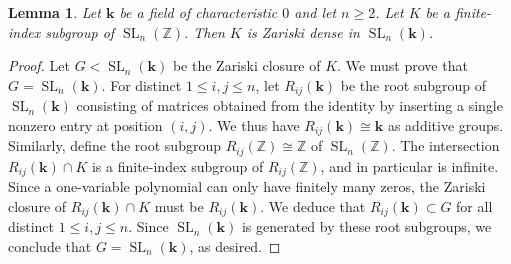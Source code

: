 \documentclass[11pt]{article}
\numberwithin{equation}{section}
\theoremstyle{plain}
\newtheorem{lemma}[theorem]{Lemma}
\theoremstyle{definition}
\theoremstyle{remark}
\DeclareMathOperator{\SL}{SL}
\newcommand\Z{\ensuremath{\mathbb{Z}}}
\newcommand\bk{\ensuremath{\mathbf{k}}}
\begin{document}
\begin{lemma}
\label{lemma:density}
Let $\bk$ be a field of characteristic $0$ and let $n \geq 2$.  Let $K$ be a finite-index subgroup of
$\SL_n(\Z)$.  Then $K$ is Zariski dense in $\SL_n(\bk)$.
\end{lemma}
\begin{proof}
Let $G < \SL_n(\bk)$ be the Zariski closure of $K$.  We must prove that $G = \SL_n(\bk)$.  For
distinct $1 \leq i,j \leq n$, let $R_{ij}(\bk)$ be the root subgroup of $\SL_n(\bk)$ consisting
of matrices obtained from the identity by inserting a single nonzero entry at position $(i,j)$.
We thus have $R_{ij}(\bk) \cong \bk$ as additive groups.  Similarly, define the root subgroup
$R_{ij}(\Z) \cong \Z$ of $\SL_n(\Z)$.  The intersection $R_{ij}(\bk) \cap K$ is a finite-index
subgroup of $R_{ij}(\Z)$, and in particular is infinite.  Since a one-variable polynomial can only
have finitely many zeros, the Zariski closure of $R_{ij}(\bk) \cap K$ must be $R_{ij}(\bk)$.  We
deduce that $R_{ij}(\bk) \subset G$ for all distinct $1 \leq i,j \leq n$.  Since $\SL_n(\bk)$
is generated by these root subgroups, we conclude that $G = \SL_n(\bk)$, as desired.
\end{proof}
\end{document}
